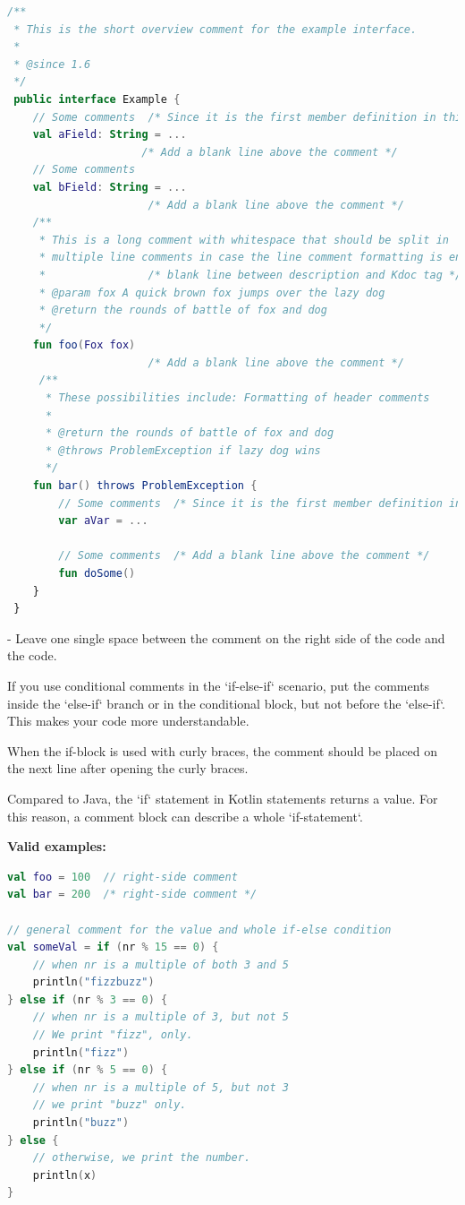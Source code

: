 \begin{lstlisting}[language=Kotlin]
/**
 * This is the short overview comment for the example interface.
 *
 * @since 1.6
 */
 public interface Example {
    // Some comments  /* Since it is the first member definition in this code block, there is no need to add a blank line here */
    val aField: String = ...
                     /* Add a blank line above the comment */
    // Some comments
    val bField: String = ...
                      /* Add a blank line above the comment */
    /**
     * This is a long comment with whitespace that should be split in
     * multiple line comments in case the line comment formatting is enabled.
     *                /* blank line between description and Kdoc tag */
     * @param fox A quick brown fox jumps over the lazy dog
     * @return the rounds of battle of fox and dog
     */
    fun foo(Fox fox)
                      /* Add a blank line above the comment */
     /**
      * These possibilities include: Formatting of header comments
      *
      * @return the rounds of battle of fox and dog
      * @throws ProblemException if lazy dog wins
      */
    fun bar() throws ProblemException {
        // Some comments  /* Since it is the first member definition in this range, there is no need to add a blank line here */
        var aVar = ...

        // Some comments  /* Add a blank line above the comment */
        fun doSome()
    }
 }
\end{lstlisting}


- Leave one single space between the comment on the right side of the code and the code.

If you use conditional comments in the `if-else-if` scenario, put the comments inside the `else-if` branch or in the conditional block, but not before the `else-if`. This makes your code more understandable.

When the if-block is used with curly braces, the comment should be placed on the next line after opening the curly braces.

Compared to Java, the `if` statement in Kotlin statements returns a value. For this reason, a comment block can describe a whole `if-statement`.



\textbf{Valid examples:}



\begin{lstlisting}[language=Kotlin]
val foo = 100  // right-side comment
val bar = 200  /* right-side comment */

// general comment for the value and whole if-else condition
val someVal = if (nr % 15 == 0) {
    // when nr is a multiple of both 3 and 5
    println("fizzbuzz")
} else if (nr % 3 == 0) {
    // when nr is a multiple of 3, but not 5
    // We print "fizz", only.
    println("fizz")
} else if (nr % 5 == 0) {
    // when nr is a multiple of 5, but not 3
    // we print "buzz" only.
    println("buzz")
} else {
    // otherwise, we print the number.
    println(x)
}
\end{lstlisting}


